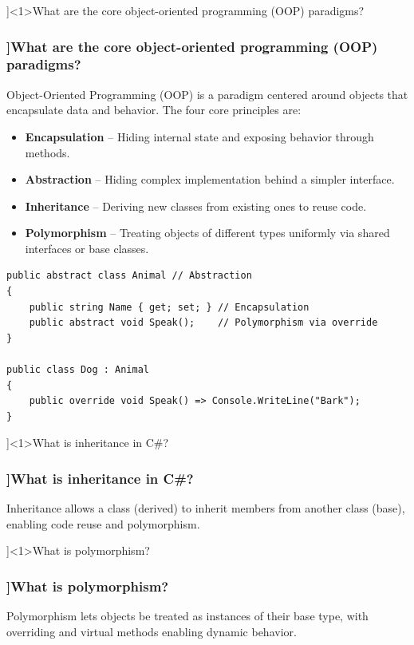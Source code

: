 \QuestionSlide[\CategoryBadge[OOPColor!20]{OOP}]<1>{What are the core object-oriented programming (OOP) paradigms?}

\begin{frame}[fragile]
  \frametitle{\AnswerTitle[\CategoryBadge[OOPColor!20]{OOP}]{What are the core object-oriented programming (OOP) paradigms?}}

  {\footnotesize
  Object-Oriented Programming (OOP) is a paradigm centered around objects that encapsulate data and behavior.  
  The four core principles are:
  \begin{itemize}
      \item \textbf{Encapsulation} – Hiding internal state and exposing behavior through methods.
      \item \textbf{Abstraction} – Hiding complex implementation behind a simpler interface.
      \item \textbf{Inheritance} – Deriving new classes from existing ones to reuse code.
      \item \textbf{Polymorphism} – Treating objects of different types uniformly via shared interfaces or base classes.
  \end{itemize}
  }
  
  \begin{verbatim}
public abstract class Animal // Abstraction
{
    public string Name { get; set; } // Encapsulation
    public abstract void Speak();    // Polymorphism via override
}

public class Dog : Animal
{
    public override void Speak() => Console.WriteLine("Bark");
}
  \end{verbatim}
\end{frame}

\QuestionSlide[\CategoryBadge[OOPColor!20]{OOP}]<1>{What is inheritance in C\#?}

\begin{frame}[fragile]
  \frametitle{\AnswerTitle[\CategoryBadge[OOPColor!20]{OOP}]{What is inheritance in C\#?}}

  {\footnotesize
  Inheritance allows a class (derived) to inherit members from another class (base), enabling code reuse and polymorphism.
  }
\end{frame}

\QuestionSlide[\CategoryBadge[OOPColor!20]{OOP}]<1>{What is polymorphism?}

\begin{frame}[fragile]
  \frametitle{\AnswerTitle[\CategoryBadge[OOPColor!20]{OOP}]{What is polymorphism?}}

  {\footnotesize
  Polymorphism lets objects be treated as instances of their base type, with overriding and virtual methods enabling dynamic behavior.
  }
\end{frame}

